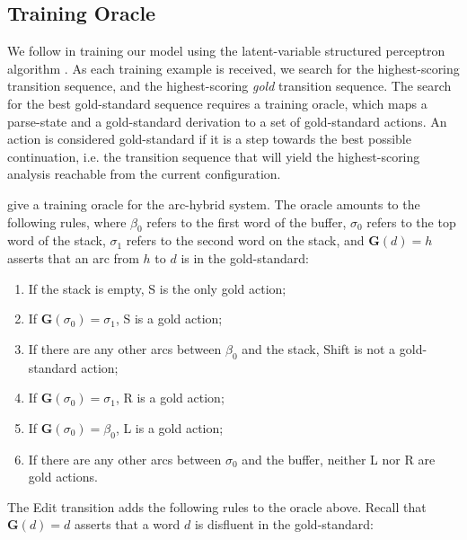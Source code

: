 \documentclass[11pt,letterpaper]{article}
\begin{document}
\subsection{Training Oracle}

We follow \citet{honnibal:14} in training our model using the latent-variable
structured perceptron algorithm \citep{sun:09}.  As each training example is
received, we search for the highest-scoring transition sequence, and the highest-scoring
\emph{gold} transition sequence.  The search for the best gold-standard sequence
requires a training oracle, which maps a parse-state and a gold-standard derivation
to a set of gold-standard actions.  An action is considered gold-standard if
it is a step towards the best possible continuation, i.e. the
transition sequence that will yield the highest-scoring analysis reachable from
the current configuration.

\citet{goldberg:13} give a training oracle for the arc-hybrid system.  The oracle
amounts to the following rules, where $\beta_0$ refers to the first word of the
buffer, $\sigma_0$ refers to the top word of the stack, $\sigma_1$ refers
to the second word on the stack, and $\mathbf{G}(d)=h$ asserts that an arc from $h$
to $d$ is in the gold-standard:

\begin{enumerate}
    \item If the stack is empty, S is the only gold action;
    \item If $\mathbf{G}(\sigma_0)=\sigma_1$, S is a gold action; 
    \item If there are any other arcs between $\beta_0$ and the stack, Shift is 
          not a gold-standard action;
      \item If $\mathbf{G}(\sigma_0)=\sigma_1$, R is a gold action;
      \item If $\mathbf{G}(\sigma_0)=\beta_0$, L is a gold action;
    \item If there are any other arcs between $\sigma_0$ and the buffer, neither
          L nor R are gold actions.
\end{enumerate}

\noindent The \citet{honnibal:14} Edit transition adds the following rules to the oracle
above. Recall that $\mathbf{G}(d)=d$ asserts that a word $d$ is disfluent in the
gold-standard:
\end{document}
